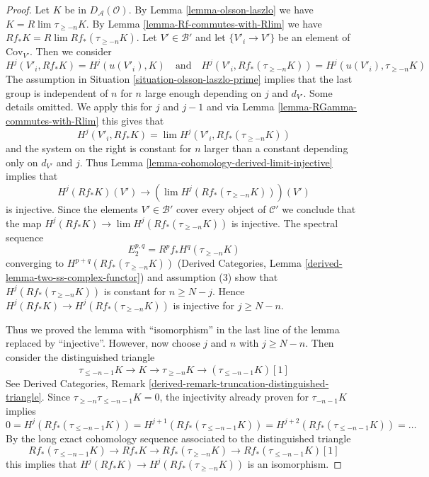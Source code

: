 \begin{proof}
Let $K$ be in $D_\mathcal{A}(\mathcal{O})$.
By Lemma \ref{lemma-olsson-laszlo} we have $K = R\lim \tau_{\geq -n}K$.
By Lemma \ref{lemma-Rf-commutes-with-Rlim}
we have $Rf_*K = R\lim Rf_*(\tau_{\geq -n}K)$.
Let $V' \in \mathcal{B}'$ and let $\{V'_i \to V'\}$ be an element
of $\text{Cov}_{V'}$. Then we consider
$$
H^j(V'_i, Rf_*K) = H^j(u(V'_i), K)
\quad\text{and}\quad
H^j(V'_i, Rf_*(\tau_{\geq -n}K)) = H^j(u(V'_i), \tau_{\geq -n}K)
$$
The assumption in Situation \ref{situation-olsson-laszlo-prime}
implies that the last group is independent of $n$ for $n$ large enough
depending on $j$ and $d_{V'}$. Some details omitted.
We apply this for $j$ and $j - 1$ and via
Lemma \ref{lemma-RGamma-commutes-with-Rlim} this gives that
$$
H^j(V'_i, Rf_*K) = \lim H^j(V'_i, Rf_*(\tau_{\geq -n} K))
$$
and the system on the right is constant for $n$ larger than
a constant depending only on $d_{V'}$ and $j$.
Thus Lemma \ref{lemma-cohomology-derived-limit-injective}
implies that
$$
H^j(Rf_*K)(V') \longrightarrow
\left(\lim H^j(Rf_*(\tau_{\geq -n}K))\right)(V')
$$
is injective. Since the elements $V' \in \mathcal{B}'$ cover
every object of $\mathcal{C}'$ we conclude that the map
$H^j(Rf_*K) \to \lim H^j(Rf_*(\tau_{\geq -n}K))$ is injective.
The spectral sequence
$$
E_2^{p, q} = R^pf_*H^q(\tau_{\geq -n}K)
$$
converging to $H^{p + q}(Rf_*(\tau_{\geq -n}K))$
(Derived Categories, Lemma \ref{derived-lemma-two-ss-complex-functor})
and assumption (3) show that
$H^j(Rf_*(\tau_{\geq -n}K))$ is constant for $n \geq N - j$.
Hence $H^j(Rf_*K) \to H^j(Rf_*(\tau_{\geq -n}K))$ is injective
for $j \geq N - n$.

\medskip\noindent
Thus we proved the lemma with ``isomorphism'' in the last line of
the lemma replaced by ``injective''. However, now choose $j$ and $n$
with $j \geq N - n$. Then consider the distinguished triangle
$$
\tau_{\leq -n - 1}K \to K \to \tau_{\geq -n}K \to (\tau_{\leq -n - 1}K)[1]
$$
See Derived Categories, Remark
\ref{derived-remark-truncation-distinguished-triangle}.
Since $\tau_{\geq -n}\tau_{\leq -n -1}K = 0$, the
injectivity already proven for $\tau_{-n - 1}K$ implies
$$
0 = H^j(Rf_*(\tau_{\leq -n - 1}K)) =
H^{j + 1}(Rf_*(\tau_{\leq -n - 1}K)) =
H^{j + 2}(Rf_*(\tau_{\leq -n - 1}K)) = \ldots
$$
By the long exact cohomology sequence associated to the distinguished
triangle
$$
Rf_*(\tau_{\leq -n - 1}K) \to Rf_*K \to Rf_*(\tau_{\geq -n}K) \to
Rf_*(\tau_{\leq -n - 1}K)[1]
$$
this implies that $H^j(Rf_*K) \to H^j(Rf_*(\tau_{\geq -n}K))$
is an isomorphism.
\end{proof}








